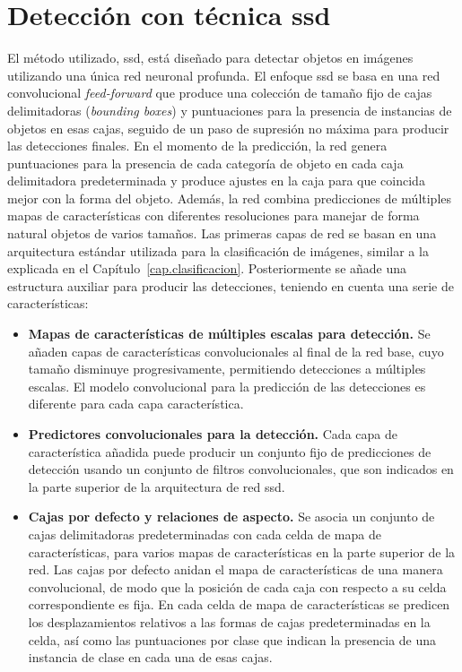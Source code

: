 \section{Detección con técnica \acrshort{ssd}}
El método utilizado, \acrshort{ssd}, está diseñado para detectar objetos en imágenes utilizando una única red neuronal profunda. El enfoque \acrshort{ssd} se basa en una red convolucional \textit{feed-forward} que produce una colección de tamaño fijo de cajas delimitadoras (\textit{bounding boxes}) y puntuaciones para la presencia de instancias de objetos en esas cajas, seguido de un paso de supresión no máxima para producir las detecciones finales. En el momento de la predicción, la red genera puntuaciones para la presencia de cada categoría de objeto en cada caja delimitadora predeterminada y produce ajustes en la caja para que coincida mejor con la forma del objeto. Además, la red combina predicciones de múltiples mapas de características con diferentes resoluciones para manejar de forma natural objetos de varios tamaños. Las primeras capas de red se basan en una arquitectura estándar utilizada para la clasificación de imágenes, similar a la explicada en el Capítulo~\ref{cap.clasificacion}. Posteriormente se añade una estructura auxiliar para producir las detecciones, teniendo en cuenta una serie de características:
\begin{itemize}
	\item \textbf{Mapas de características de múltiples escalas para detección.} Se añaden capas de características convolucionales al final de la red base, cuyo tamaño disminuye progresivamente, permitiendo detecciones a múltiples escalas. El modelo convolucional para la predicción de las detecciones es diferente para cada capa característica.
	\vspace{10pt}
	\item \textbf{Predictores convolucionales para la detección.} Cada capa de característica añadida puede producir un conjunto fijo de predicciones de detección usando un conjunto de filtros convolucionales, que son indicados en la parte superior de la arquitectura de red \acrshort{ssd}.
	\item \textbf{Cajas por defecto y relaciones de aspecto.} Se asocia un conjunto de cajas delimitadoras predeterminadas con cada celda de mapa de características, para varios mapas de características en la parte superior de la red. Las cajas por defecto anidan el mapa de características de una manera convolucional, de modo que la posición de cada caja con respecto a su celda correspondiente es fija. En cada celda de mapa de características se predicen los desplazamientos relativos a las formas de cajas predeterminadas en la celda, así como las puntuaciones por clase que indican la presencia de una instancia de clase en cada una de esas cajas.
\end{itemize}

